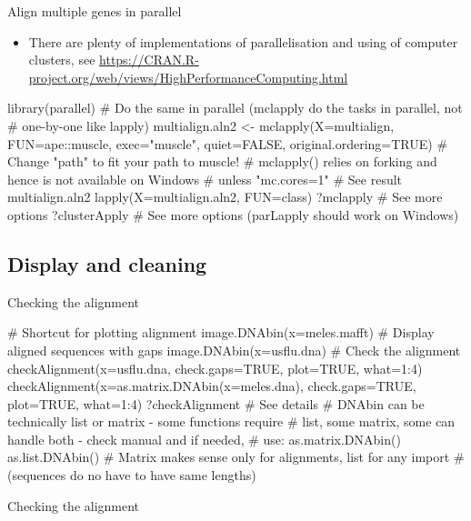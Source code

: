 \documentclass[compress, ucs, xelatex, 11pt, xcolor=svgnames, aspectratio=169,
	hyperref={
		bookmarks=true,
		unicode=true,
		colorlinks=true,
		pdftitle={Molecular data in R},
		plainpages=false,
		pdfauthor={Vojtech Zeisek},
		pdfsubject={Course about phylogeny and evolution in R},
		pdfcreator={XeLaTeX},
		pdfkeywords={R, evolution, phylogeny, molecular data},
		linkcolor=Crimson, %
		anchorcolor=Magenta, %
		citecolor=Magenta, %
		filecolor=Magenta, %
		menucolor=Magenta, %
		urlcolor=DodgerBlue, %
		pdftex},
	url={hyphens, lowtilde} %
	]{beamer}
\renewcommand{\texttt}[1]{\colorbox{Beige}{{\ttfamily #1}}}
\begin{document}
\begin{frame}[fragile]{Align multiple genes in parallel}
	\begin{itemize}
		\item There are plenty of implementations of parallelisation and using of computer clusters, see \url{https://CRAN.R-project.org/web/views/HighPerformanceComputing.html}
	\end{itemize}
	\begin{spluscode}
    library(parallel)
    # Do the same in parallel (mclapply do the tasks in parallel, not
    # one-by-one like lapply)
    multialign.aln2 <- mclapply(X=multialign, FUN=ape::muscle,
      exec="muscle", quiet=FALSE, original.ordering=TRUE)
    # Change "path" to fit your path to muscle!
    # mclapply() relies on forking and hence is not available on Windows
    # unless "mc.cores=1"
    # See result
    multialign.aln2
    lapply(X=multialign.aln2, FUN=class)
    ?mclapply # See more options
    ?clusterApply # See more options (parLapply should work on Windows)
	\end{spluscode}
\end{frame}

\subsection{Display and cleaning}

\begin{frame}[fragile]{Checking the alignment}
	\begin{spluscode}
    # Shortcut for plotting alignment
    image.DNAbin(x=meles.mafft)
    # Display aligned sequences with gaps
    image.DNAbin(x=usflu.dna)
    # Check the alignment
    checkAlignment(x=usflu.dna, check.gaps=TRUE, plot=TRUE, what=1:4)
    checkAlignment(x=as.matrix.DNAbin(x=meles.dna), check.gaps=TRUE,
      plot=TRUE, what=1:4)
    ?checkAlignment # See details
    # DNAbin can be technically list or matrix - some functions require
    # list, some matrix, some can handle both - check manual and if needed,
    # use:
    as.matrix.DNAbin()
    as.list.DNAbin()
    # Matrix makes sense only for alignments, list for any import
    # (sequences do no have to have same lengths)
	\end{spluscode}
\end{frame}

\begin{frame}{Checking the alignment}
	\begin{center}
		\texttt{[image: checkalignment.png]}
	\end{center}
\end{frame}
\end{document}
